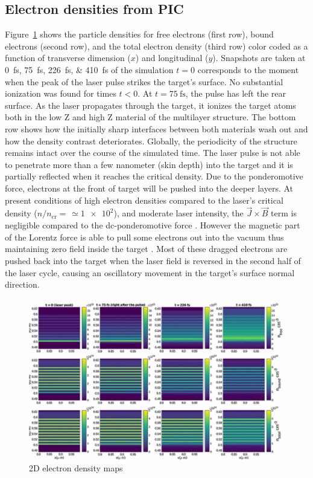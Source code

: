\documentclass[preprint, 12pt]{elsarticle}
\begin{document}
\subsection{Electron densities from PIC\label{sec:electron_densities}}
Figure~\ref{fig:pic_edens_2D} shows the particle densities for free electrons
(first row), bound electrons (second row), and the total electron density (third
row) color coded as a function of transverse dimension ($x$) and longitudinal
($y$). Snapshots are taken at \SIlist{0;75;226;410}{\fs} of the simulation
$t=0$ corresponds to the moment when the peak of the laser pulse strikes the
target's surface. No substantial ionization was found for times $t<0$.
At $t=\SI{75}{\fs}$, the pulse has left the rear surface.
As the laser propagates through the target, it ionizes the target atoms both in
the low Z and high Z material of the multilayer structure. The bottom row shows
how the initially sharp interfaces between both materials wash out and how the
density contrast deteriorates. Globally, the periodicity of the structure
remains intact over the course of the simulated time.
The laser pulse is not able to penetrate more than a few nanometer (skin depth)
into the target and it is partially reflected when it reaches the critical density.
Due to the ponderomotive force, electrons at the front of target will be pushed
into the deeper layers. At present conditions of high electron densities
compared to the laser's critical density ($n/n_\text{cr} = \frac{}{}\simeq
\num{1e2}$), and moderate laser intensity, the  $\vec{J} \times \vec{B}$ term is
negligible compared to the dc-ponderomotive force \cite{TBD}.
However the magnetic part of the Lorentz force is able to pull some electrons out into the vacuum
thus maintaining zero field inside the target \cite{TBD}.
Most of these dragged electrons are pushed back into the target when the laser
field is reversed in the second half of the laser cycle, causing an oscillatory
movement in the target's surface normal direction.
%
\begin{figure}[ht]
  \centering\includegraphics[width=1.0\linewidth]{figures/paper_plot.png}
  \caption{2D electron density maps}
  \label{fig:pic_edens_2D}
\end{figure}
\end{document}
